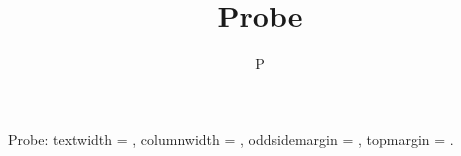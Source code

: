 \documentclass[IJPHM, 2014, 00]{PHMSociety}
\begin{document}
\title{Probe}
\author{P}
\address{}
\maketitle
Probe: textwidth = \the\textwidth, columnwidth = \the\columnwidth, oddsidemargin = \the\oddsidemargin, topmargin = \the\topmargin.
\end{document}

